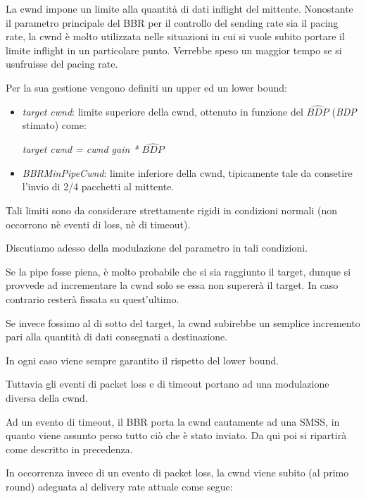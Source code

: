 La cwnd impone un limite alla quantità di dati inflight del mittente. Nonostante il parametro principale del BBR per il controllo del sending rate sia il pacing rate, la cwnd è molto utilizzata nelle situazioni in cui si vuole subito portare il limite inflight in un particolare punto. Verrebbe speso un maggior tempo se si usufruisse del pacing rate. \bigskip

Per la sua gestione vengono definiti un upper ed un lower bound:

\begin{itemize}

\item \textit{target cwnd}: limite superiore della cwnd, ottenuto in funzione del $ \widehat{\textit{BDP}} $ (\textit{BDP} stimato) come:

\begin{center}
\textit{target cwnd = cwnd gain * $ \widehat{\textit{BDP}} $}
\end{center}

\item \textit{BBRMinPipeCwnd}: limite inferiore della cwnd, tipicamente tale da consetire l'invio di 2/4 pacchetti al mittente.

\end{itemize}

Tali limiti sono da considerare strettamente rigidi in condizioni normali (non occorrono nè eventi di loss, nè di timeout). \bigskip

Discutiamo adesso della modulazione del parametro in tali condizioni. \bigskip

Se la pipe fosse piena, è molto probabile che si sia raggiunto il target, dunque si provvede ad incrementare la cwnd solo se essa non supererà il target. In caso contrario resterà fissata su quest'ultimo. \bigskip 

Se invece fossimo al di sotto del target, la cwnd subirebbe un semplice incremento pari alla quantità di dati consegnati a destinazione. \bigskip

In ogni caso viene sempre garantito il rispetto del lower bound. \bigskip

Tuttavia gli eventi di packet loss e di timeout portano ad una modulazione diversa della cwnd. \bigskip

Ad un evento di timeout, il BBR porta la cwnd cautamente ad una SMSS, in quanto viene assunto perso tutto ciò che è stato inviato. Da qui poi si ripartirà come descritto in precedenza. \bigskip

In occorrenza invece di un evento di packet loss, la cwnd viene subito (al primo round) adeguata al delivery rate attuale come segue:

